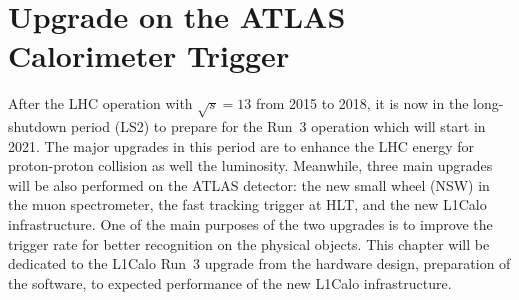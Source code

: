 \chapter{Upgrade on the ATLAS Calorimeter Trigger}
After the LHC operation with $\sqrt{s}=13$ from 2015 to 2018, it is now in the long-shutdown period (LS2) to prepare for the Run~3 operation which will start in 2021. The major upgrades in this period are to enhance the LHC energy for proton-proton collision as well the luminosity. Meanwhile, three main upgrades will be also performed on the ATLAS detector: the new small wheel (NSW) in the muon spectrometer\cite{STELZER20161160}, the fast tracking trigger at HLT\cite{Shochet:1552953}, and the new L1Calo infrastructure. One of the main purposes of the two upgrades is to improve the trigger rate for better recognition on the physical objects. This chapter will be dedicated to the L1Calo Run~3 upgrade from the hardware design, preparation of the software, to expected performance of the new L1Calo infrastructure.   
